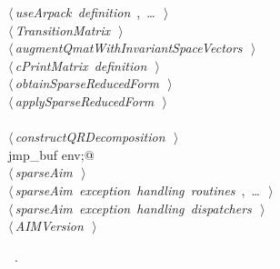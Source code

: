 \documentclass{article}
\begin{document}
\begin{flushleft}
\begin{minipage}{\linewidth}
\begin{list}{}{}
\mbox{}\verb@@\hbox{$\langle\,${\itshape useArpack definition}\nobreak\ {\footnotesize {}, \ldots\ }$\,\rangle$}\verb@@\\
\mbox{}\verb@@\hbox{$\langle\,${\itshape TransitionMatrix}\nobreak\ {\footnotesize {}}$\,\rangle$}\verb@@\\
\mbox{}\verb@@\hbox{$\langle\,${\itshape augmentQmatWithInvariantSpaceVectors}\nobreak\ {\footnotesize {}}$\,\rangle$}\verb@@\\
\mbox{}\verb@@\hbox{$\langle\,${\itshape cPrintMatrix definition}\nobreak\ {\footnotesize {}}$\,\rangle$}\verb@@\\
\mbox{}\verb@@\hbox{$\langle\,${\itshape obtainSparseReducedForm}\nobreak\ {\footnotesize {}}$\,\rangle$}\verb@@\\
\mbox{}\verb@@\hbox{$\langle\,${\itshape applySparseReducedForm}\nobreak\ {\footnotesize {}}$\,\rangle$}\verb@@\\
\mbox{}\verb@@\\
\mbox{}\verb@@\hbox{$\langle\,${\itshape constructQRDecomposition}\nobreak\ {\footnotesize {}}$\,\rangle$}\verb@@\\
\mbox{}\verb@static jmp_buf env;@\\
\mbox{}\verb@@\hbox{$\langle\,${\itshape sparseAim}\nobreak\ {\footnotesize {}}$\,\rangle$}\verb@@\\
\mbox{}\verb@@\hbox{$\langle\,${\itshape sparseAim exception handling routines}\nobreak\ {\footnotesize {}, \ldots\ }$\,\rangle$}\verb@@\\
\mbox{}\verb@@\hbox{$\langle\,${\itshape sparseAim exception handling dispatchers}\nobreak\ {\footnotesize {}}$\,\rangle$}\verb@@\\
\mbox{}\verb@@\hbox{$\langle\,${\itshape AIMVersion}\nobreak\ {\footnotesize {}}$\,\rangle$}\verb@@\\
\mbox{}\verb@@{\NWsep}
\end{list}
\vspace{-1.5ex}
\footnotesize
\begin{list}{}{\setlength{\itemsep}{-\parsep}\setlength{\itemindent}{-\leftmargin}}
\item \NWtxtMacroRefIn\ .

\item{}
\end{list}
\end{minipage}\vspace{4ex}
\end{flushleft}
\end{document}
